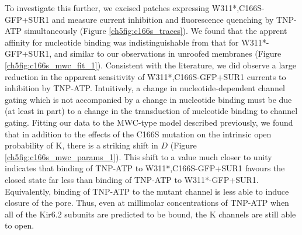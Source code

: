 \begin{figure}[h]
\begin{subfigure}[t]{0.45\textwidth}
	\end{subfigure}
	\caption[C166S alters apparent nucleotide sensitivity, but not binding]{
	}\label{ch5fig:c166s_1}
\end{figure}

To investigate this further, we excised patches expressing W311*,C166S-GFP+SUR1 and measure current inhibition and fluorescence quenching by TNP-ATP simultaneously (Figure \ref{ch5fig:c166s_traces}).
We found that the apprent affinity for nucleotide binding was indistinguishable from that for W311*-GFP+SUR1, and similar to our observations in unroofed membranes (Figure \ref{ch5fig:c166s_mwc_fit_1}).
Consistent with the literature, we did observe a large reduction in the apparent sensitivity of W311*,C166S-GFP+SUR1 currents to inhibition by TNP-ATP.
Intuitively, a change in nucleotide-dependent channel gating which is not accompanied by a change in nucleotide binding must be due (at least in part) to a change in the transduction of nucleotide binding to channel gating.
Fitting our data to the MWC-type model described previously, we found that in addition to the effects of the C166S mutation on the intrinsic open probability of K\ATP{}, there is a striking shift in $D$ (Figure \ref{ch5fig:c166s_mwc_params_1}).
This shift to a value much closer to unity indicates that binding of TNP-ATP to W311*,C166S-GFP+SUR1 favours the closed state far less than binding of TNP-ATP to W311*-GFP+SUR1.
Equivalently, binding of TNP-ATP to the mutant channel is less able to induce closure of the pore.
Thus, even at millimolar concentrations of TNP-ATP when all of the Kir6.2 subunits are predicted to be bound, the K\ATP{} channels are still able to open.

